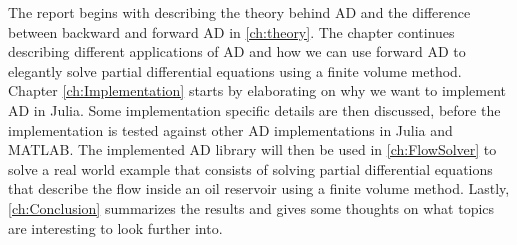 The report begins with describing the theory behind AD and the difference between backward and forward AD in \autoref{ch:theory}. The chapter continues describing different applications of AD and how we can use forward AD to elegantly solve partial differential equations using a finite volume method. Chapter \ref{ch:Implementation} starts by elaborating on why we want to implement AD in Julia. Some implementation specific details are then discussed, before the implementation is tested against other AD implementations in Julia and MATLAB. The implemented AD library will then be used in \autoref{ch:FlowSolver} to solve a real world example that consists of solving partial differential equations that describe the flow inside an oil reservoir using a finite volume method. Lastly, \autoref{ch:Conclusion} summarizes the results and gives some thoughts on what topics are interesting to look further into.



\listoftodos